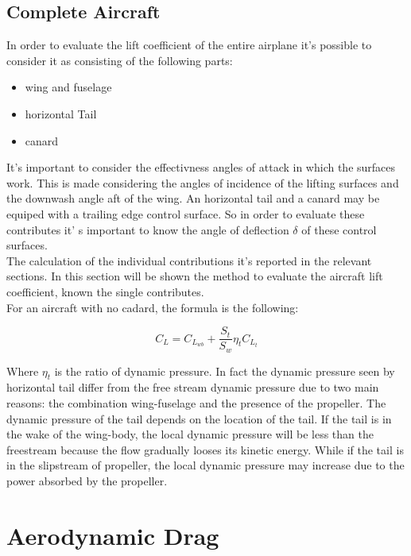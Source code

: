 
\subsection{Complete Aircraft}

In order to evaluate the lift coefficient of the entire airplane it's possible to consider it as consisting of the following parts\cite{ roskam2002airplane}:

\begin{itemize}
\item wing and fuselage
\item horizontal Tail
\item canard
\end{itemize}

It's important to consider the effectivness angles of attack in which the surfaces work. This is made considering the angles of incidence of the lifting surfaces and the downwash angle aft of the wing. An horizontal tail and a canard may be equiped with a trailing edge control surface. So in order to evaluate these contributes it' s important to know the angle of deflection $\delta$ of these control surfaces.\\
The calculation of the individual contributions it's reported in the relevant sections. In this section will be shown the method to evaluate the aircraft lift coefficient, known the single contributes.\\
For an aircraft with no cadard, the formula is the following:

\begin{equation}
C_L = C_{L_{wb}} + \frac{S_t}{S_w} \eta_t C_{L_{t}}
\end{equation}

Where $\eta_t$ is the ratio of dynamic pressure. In fact the dynamic pressure seen by horizontal tail differ from the free stream dynamic pressure due to two main reasons: the combination wing-fuselage and the presence of the propeller. The dynamic pressure of the tail depends on the location of the tail. If the tail is in the wake of the wing-body, the local dynamic pressure will be less than the freestream because the flow gradually looses its kinetic energy. While if the tail is in the slipstream of propeller, the local dynamic pressure may increase due to the power absorbed by the propeller.



\section{Aerodynamic Drag}

